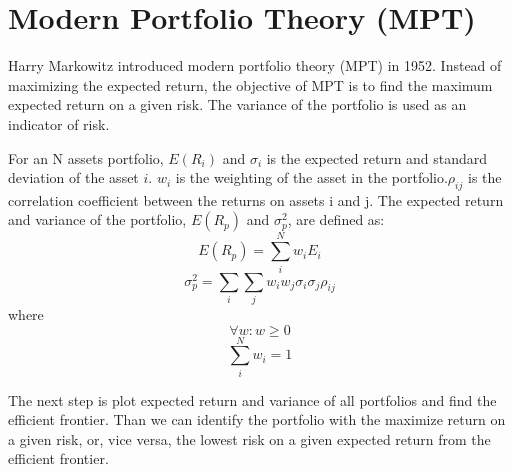 \section{Modern Portfolio Theory (MPT)}
Harry Markowitz introduced modern portfolio theory (MPT) in 1952. Instead of maximizing the expected return, the objective of MPT is to find the maximum expected return on a given risk. The variance of the portfolio is used as an indicator of risk. \cite{10.2307/2975974}
\par
For an N assets portfolio, \(E(R_i)\) and  \(\sigma_i\) is the expected return and standard deviation of the asset \(i\). \(w_i\) is the weighting of the asset in the portfolio.\(\rho_{ij}\) is the correlation coefficient between the returns on assets i and j.
The expected return and variance of the portfolio, \(E(R_p)\) and \(\sigma_p^2\), are defined as:
\[ E(R_p) = \sum_i^N w_i E_i\]
\[\sigma_p^2 = \sum_i \sum_j w_i w_j \sigma_i \sigma_j \rho_{ij}\]
where
\[\forall w: w \geq 0\]
\[\sum_i ^N w_i = 1\]
\par
The next step is plot expected return and variance of all portfolios and find the efficient frontier. Than we can identify the portfolio with the maximize return on a given risk, or, vice versa, the lowest risk on a given expected return from the efficient frontier.